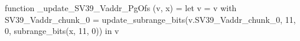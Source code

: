 function _update_SV39_Vaddr_PgOfs (v, x) = let v = { v with SV39_Vaddr_chunk_0 = update_subrange_bits(v.SV39_Vaddr_chunk_0, 11, 0, subrange_bits(x, 11, 0)) } in
  v
